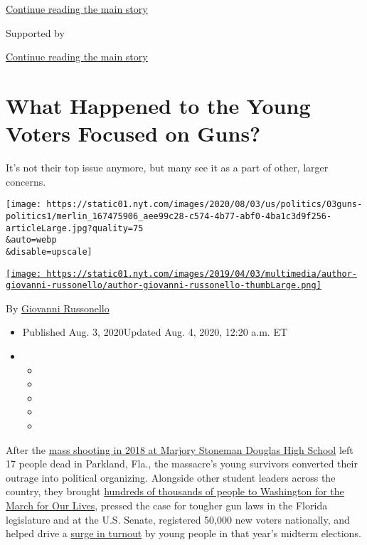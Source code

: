 \protect\hyperlink{after-top}{Continue reading the main story}

Supported by

\protect\hyperlink{after-sponsor}{Continue reading the main story}

\hypertarget{what-happened-to-the-young-voters-focused-on-guns}{%
\section{What Happened to the Young Voters Focused on
Guns?}\label{what-happened-to-the-young-voters-focused-on-guns}}

It's not their top issue anymore, but many see it as a part of other,
larger concerns.

\texttt{[image: https://static01.nyt.com/images/2020/08/03/us/politics/03guns-politics1/merlin\_167475906\_aee99c28-c574-4b77-abf0-4ba1c3d9f256-articleLarge.jpg?quality=75\\\&auto=webp\\\&disable=upscale]}

\href{https://www.nytimes.com/by/giovanni-russonello}{\texttt{[image: https://static01.nyt.com/images/2019/04/03/multimedia/author-giovanni-russonello/author-giovanni-russonello-thumbLarge.png]}}

By \href{https://www.nytimes.com/by/giovanni-russonello}{Giovanni
Russonello}

\begin{itemize}
\item
  Published Aug. 3, 2020Updated Aug. 4, 2020, 12:20 a.m. ET
\item
  \begin{itemize}
  \item
  \item
  \item
  \item
  \item
  \end{itemize}
\end{itemize}

After the
\href{https://www.nytimes.com/2019/02/13/us/parkland-anniversary-marjory-stoneman-douglas.html}{mass
shooting in 2018 at Marjory Stoneman Douglas High School} left 17 people
dead in Parkland, Fla., the massacre's young survivors converted their
outrage into political organizing. Alongside other student leaders
across the country, they brought
\href{https://www.nytimes.com/2018/03/24/us/march-for-our-lives.html}{hundreds
of thousands of people to Washington for the March for Our Lives},
pressed the case for tougher gun laws in the Florida legislature and at
the U.S. Senate, registered 50,000 new voters nationally, and helped
drive a
\href{https://www.nytimes.com/2018/11/07/us/elections-gun-control-florida.html}{surge
in turnout} by young people in that year's midterm elections.

